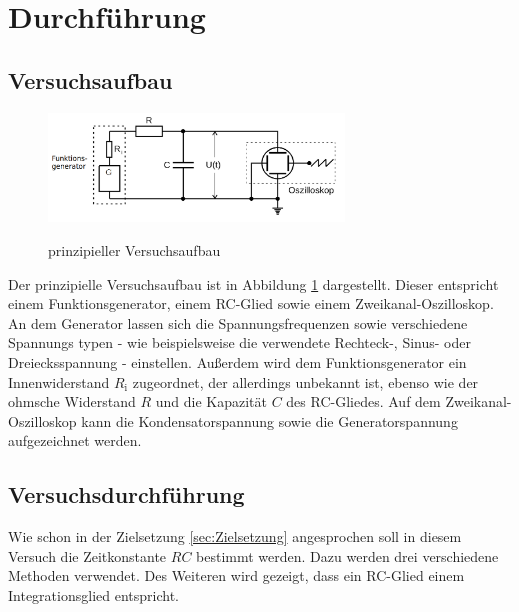 \section{Durchführung}
\label{sec:Durchführung}

\subsection{Versuchsaufbau}
\label{sec:Versuchsaufbau}

\begin{figure}
	\centering
	\includegraphics[width=0.7\textwidth]{bilder/generator.png}
	\label{fig:aufbauamk}
	\caption{prinzipieller Versuchsaufbau}
\end{figure}

Der prinzipielle Versuchsaufbau ist in Abbildung \ref{fig:aufbauamk} dargestellt.
Dieser entspricht einem Funktionsgenerator, einem RC-Glied sowie einem Zweikanal-Oszilloskop.
An dem Generator lassen sich die Spannungsfrequenzen sowie verschiedene Spannungs
typen - wie beispielsweise die verwendete Rechteck-, Sinus- oder Dreiecksspannung - einstellen. Außerdem wird dem Funktionsgenerator ein Innenwiderstand $R_{\text{i}}$ zugeordnet, der allerdings unbekannt ist, ebenso wie der ohmsche Widerstand $R$ und die Kapazität $C$ des RC-Gliedes.
Auf dem Zweikanal-Oszilloskop kann die Kondensatorspannung sowie die Generatorspannung aufgezeichnet werden.

\subsection{Versuchsdurchführung}
\label{sec:Versuchsdurchführung}

Wie schon in der Zielsetzung \ref{sec:Zielsetzung} angesprochen soll in diesem Versuch die
Zeitkonstante $RC$ bestimmt werden.
Dazu werden drei verschiedene Methoden verwendet.
Des Weiteren wird gezeigt, dass ein RC-Glied einem Integrationsglied entspricht.

